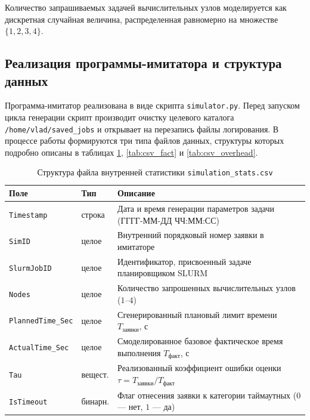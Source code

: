 Количество запрашиваемых задачей вычислительных узлов моделируется как дискретная случайная величина, распределенная равномерно на множестве $\{1, 2, 3, 4\}$.

\subsection*{Реализация программы-имитатора и структура данных}
Программа-имитатор реализована в виде скрипта \texttt{simulator.py}. Перед запуском цикла генерации скрипт производит очистку целевого каталога \texttt{/home/vlad/saved\_jobs} и открывает на перезапись файлы логирования. В процессе работы формируются три типа файлов данных, структуры которых подробно описаны в таблицах \ref{tab:csv_plan}, \ref{tab:csv_fact} и \ref{tab:csv_overhead}.

\begin{table}[H]
\caption{Структура файла внутренней статистики \texttt{simulation\_stats.csv}}
\label{tab:csv_plan}
\centering
\small
\begin{tabular}{|l|l|p{7.5cm}|}
\hline
Поле & Тип & Описание \\
\hline
\texttt{Timestamp}          & строка  & Дата и время генерации параметров задачи (ГГГГ-ММ-ДД ЧЧ:ММ:СС) \\
\texttt{SimID}              & целое   & Внутренний порядковый номер заявки в имитаторе \\
\texttt{SlurmJobID}         & целое   & Идентификатор, присвоенный задаче планировщиком SLURM \\
\texttt{Nodes}              & целое   & Количество запрошенных вычислительных узлов ($1$–$4$) \\
\texttt{PlannedTime\_Sec}   & целое   & Сгенерированный плановый лимит времени $T_{\text{заявки}}$, с \\
\texttt{ActualTime\_Sec}    & целое   & Смоделированное базовое фактическое время выполнения $T_{\text{факт}}$, с \\
\texttt{Tau}                & вещест. & Реализованный коэффициент ошибки оценки $\tau = T_{\text{заявки}} / T_{\text{факт}}$ \\
\texttt{IsTimeout}          & бинарн. & Флаг отнесения заявки к категории таймаутных ($0$ — нет, $1$ — да) \\
\hline
\end{tabular}
\end{table}

